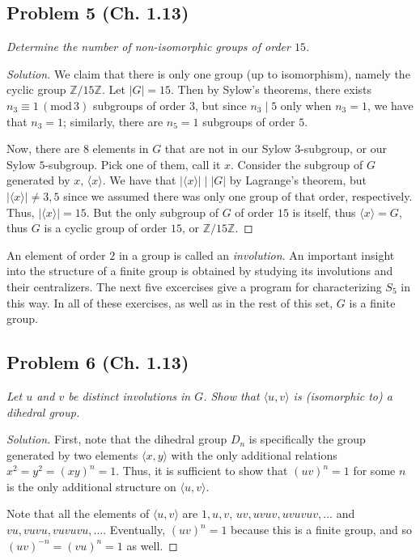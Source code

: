 \documentclass{article}
\newcommand{\Z}{{\mathbb Z}}
\begin{document}
\subsection*{Problem 5 (Ch. 1.13)}
{\it Determine the number of non-isomorphic groups of order $15$.}
\begin{proof}[Solution]\let\qed\relax
	We claim that there is only one group (up to isomorphism),
	namely the cyclic group $\Z/15\Z$.
	Let $|G| = 15$.
	Then by Sylow's theorems, there exists $n_3 \equiv 1\,(\mathrm{mod}\,3)$
	subgroups of order $3$, but since $n_3 \mid 5$ only when $n_3 = 1$,
	we have that $n_3 = 1$;
	similarly, there are $n_5 = 1$ subgroups of order $5$.

	Now, there are $8$ elements in $G$ that are not in
	our Sylow $3$-subgroup, or our Sylow $5$-subgroup.
	Pick one of them, call it $x$.
	Consider the subgroup of $G$ generated by $x$, $\langle x \rangle$.
	We have that $|\langle x \rangle | \mid |G|$ by Lagrange's theorem,
	but $|\langle x \rangle | \neq 3,5$ since we assumed
	there was only one group of that order, respectively.
	Thus, $|\langle x \rangle| = 15$.
	But the only subgroup of $G$ of order $15$ is itself,
	thus $\langle x \rangle = G$,
	thus $G$ is a cyclic group of order $15$, or $\Z/15\Z$.
\end{proof}
\clearpage

An element of order $2$ in a group is called an \emph{involution}.
An important insight into the structure of a finite group is obtained
by studying its involutions and their centralizers.
The next five excercises give a program for characterizing $S_5$ in this way.
In all of these exercises, as well as in the rest of this set, $G$ is a finite group.

\subsection*{Problem 6 (Ch. 1.13)}
{\it Let $u$ and $v$ be distinct involutions in $G$.
Show that $\langle u,v \rangle$ is (isomorphic to) a dihedral group.}
\begin{proof}[Solution]\let\qed\relax
	First, note that the dihedral group $D_n$
	is specifically the group
	generated by two elements $\langle x,y \rangle$
	with the only additional relations $x^2 = y^2 = (xy)^n = 1$.
	Thus, it is sufficient to show that $(uv)^n = 1$ for some $n$
	is the only additional structure on $\langle u,v\rangle$.

	Note that all the elements of $\langle u ,v \rangle$ are
	$1, u, v$, $uv, uvuv, uvuvuv, \dots$ and $vu, vuvu, vuvuvu, \dots$.
	Eventually, $(uv)^n = 1$ because this is a finite group,
	and so $(uv)^{-n} = (vu)^n = 1$ as well.
\end{proof}
\end{document}

